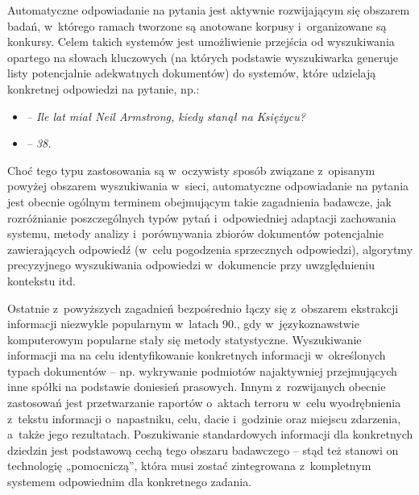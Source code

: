 \begin{multicols}{2}
Automatyczne odpowiadanie na pytania jest aktywnie rozwijającym się
obszarem badań, w~którego ramach tworzone są anotowane korpusy
i~organizowane są konkursy. Celem takich systemów jest umożliwienie
przejścia od wyszukiwania opartego na słowach kluczowych (na
których podstawie wyszukiwarka generuje listy potencjalnie
adekwatnych dokumentów) do systemów, które udzielają konkretnej
odpowiedzi na pytanie, np.: 

\begin{itemize} 
  \item[] \textit{– Ile lat miał Neil Armstrong,
kiedy stanął na Księżycu?} 
  \item[] \textit{– 38. } 
\end{itemize} 

Choć tego typu zastosowania są w~oczywisty sposób związane
z~opisanym powyżej obszarem wyszukiwania w~sieci, automatyczne
odpowiadanie na pytania jest obecnie ogólnym terminem obejmującym
takie zagadnienia badawcze, jak rozróżnianie poszczególnych typów
pytań i~odpowiedniej adaptacji zachowania systemu, metody analizy
i~porównywania zbiorów dokumentów potencjalnie zawierających
odpowiedź (w~celu pogodzenia sprzecznych odpowiedzi), algorytmy
precyzyjnego wyszukiwania odpowiedzi w~dokumencie przy uwzględnieniu
kontekstu itd. 

Ostatnie z~powyższych zagadnień bezpośrednio łączy się
z~obszarem ekstrakcji informacji niezwykle popularnym w~latach 90.,
gdy w~językoznawstwie komputerowym popularne stały się metody
statystyczne. Wyszukiwanie informacji ma na celu identyfikowanie
konkretnych informacji w~określonych typach dokumentów – np.
wykrywanie podmiotów najaktywniej przejmujących inne spółki na
podstawie doniesień prasowych. Innym z~rozwijanych obecnie
zastosowań jest przetwarzanie raportów o~aktach terroru w~celu
wyodrębnienia z~tekstu informacji o~napastniku, celu, dacie
i~godzinie oraz miejscu zdarzenia, a~także jego rezultatach.
Poszukiwanie standardowych informacji dla konkretnych dziedzin jest
podstawową cechą tego obszaru badawczego – stąd też stanowi on
technologię „pomocniczą”, która musi zostać zintegrowana
z~kompletnym systemem odpowiednim dla konkretnego zadania. 



\end{multicols}
